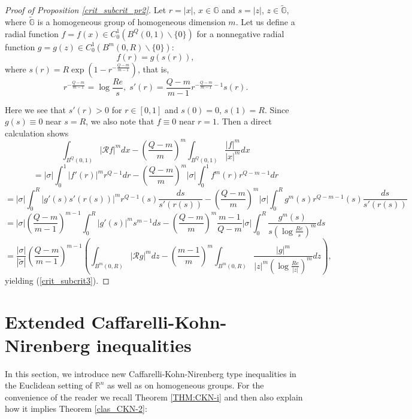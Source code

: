 \documentclass[a4paper,12pt,reqno]{amsart}
\renewcommand\eqref[1]{(\ref{#1})} %
\numberwithin{equation}{section}
\theoremstyle{plain}
\theoremstyle{definition}
\newcommand{\Rn}{\mathbb R^{n}}
\begin{document}
\begin{proof}[Proof of Proposition \ref{crit_subcrit_pr2}] Let $r=|x|$, $x\in\mathbb{G}$ and $s=|z|$, $z\in\mathbb{\widetilde{G}}$, where $\mathbb{\widetilde{G}}$ is a homogeneous group
of homogeneous dimension $m$. Let us define a radial function $f=f(x)\in C_{0}^{1}(B^{Q}(0,1)\backslash\{0\})$ for a nonnegative radial function $g=g(z)\in C_{0}^{1}(B^{m}(0,R)\backslash\{0\})$:
\begin{equation}\label{crit_subcrit4}
f(r)=g(s(r)),
\end{equation}
where $s(r)=R\exp(1-r^{-\frac{Q-m}{m-1}})$, that is,
$$r^{-\frac{Q-m}{m-1}}=\log\frac{Re}{s}, \;s'(r)=\frac{Q-m}{m-1}r^{-\frac{Q-m}{m-1}-1}s(r).$$

Here we see that $s'(r)>0$ for $r\in[0,1]$ and $s(0)=0$, $s(1)=R$. Since $g(s)\equiv0$ near $s=R$, we also note that $f\equiv0$ near $r=1$. Then a direct calculation shows
$$\int_{B^{Q}(0,1)}|\mathcal{R}f|^{m}dx-\left(\frac{Q-m}{m}\right)^{m}\int_{B^{Q}(0,1)}\frac{|f|^{m}}{|x|^{m}}dx$$
$$=|\sigma|\int_{0}^{1}|f'(r)|^{m}r^{Q-1}dr-\left(\frac{Q-m}{m}\right)^{m}|\sigma|\int_{0}^{1}f^{m}(r)r^{Q-m-1}dr$$
$$=|\sigma|\int_{0}^{R}|g'(s)s'(r(s))|^{m}r^{Q-1}(s)\frac{ds}{s'(r(s))}-\left(\frac{Q-m}{m}\right)^{m}|\sigma|\int_{0}^{R}g^{m}(s)
r^{Q-m-1}(s)\frac{ds}{s'(r(s))}$$
$$=|\sigma|\left(\frac{Q-m}{m-1}\right)^{m-1}\int_{0}^{R}|g'(s)|^{m}s^{m-1}ds-\left(\frac{Q-m}{m}\right)^{m}\frac{m-1}{Q-m}
|\sigma|\int_{0}^{R}\frac{g^{m}(s)}{s\left(\log\frac{Re}{s}\right)^{m}}ds$$
$$=\frac{|\sigma|}{|\widetilde{\sigma}|}\left(\frac{Q-m}{m-1}\right)^{m-1}\left(\int_{B^{m}(0,R)}|\mathcal{R}g|^{m}dz-
\left(\frac{m-1}{m}\right)^{m}\int_{B^{m}(0,R)}\frac{|g|^{m}}{|z|^{m}\left(\log\frac{Re}{|z|}\right)^{m}}dz\right),$$
yielding \eqref{crit_subcrit3}.
\end{proof}


\section{Extended Caffarelli-Kohn-Nirenberg inequalities}\label{SEC:CKN}

In this section, we introduce new Caffarelli-Kohn-Nirenberg type inequalities in the Euclidean setting of $\Rn$ as well as on homogeneous groups. For the convenience of the reader we recall Theorem \ref{THM:CKN-i} and then also explain how it implies Theorem \ref{clas_CKN-2}:
\end{document}

